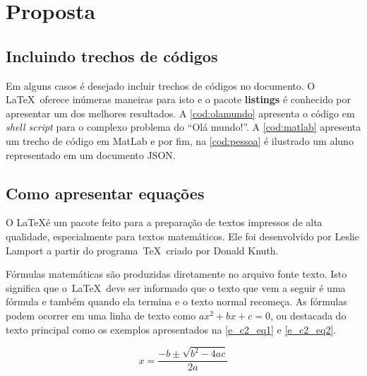 \chapter{Proposta}\label{cap:proposta}


\section{Incluindo trechos de códigos}\label{sec:codigos}

Em alguns casos é desejado incluir trechos de códigos no documento. O \LaTeX~oferece inúmeras maneiras para isto e o pacote \textbf{listings} é conhecido por apresentar um dos melhores resultados. A \autoref{cod:olamundo} apresenta o código em \textit{shell script} para o complexo problema do ``Olá mundo!''. A \autoref{cod:matlab} apresenta um trecho de código em MatLab e por fim, na \autoref{cod:pessoa} é ilustrado um aluno representado em um documento JSON.








\section{Como apresentar equações}\label{sec:equacoes}

O \LaTeX é um pacote feito para a preparação de textos impressos de alta qualidade, especialmente
para textos matemáticos. Ele foi desenvolvido por Leslie Lamport a partir do programa~\TeX~criado por Donald Knuth.

Fórmulas matemáticas são produzidas diretamente no arquivo fonte texto. Isto significa que o~\LaTeX~deve ser informado que o texto que vem a seguir é uma fórmula e também quando ela termina e o texto normal recomeça. As fórmulas podem ocorrer em uma linha de texto como $ ax^2 + bx + c = 0 $, ou destacada do texto principal como os exemplos apresentados na \autoref{e_c2_eq1} e \autoref{e_c2_eq2}.

\begin{equation}
 x=\frac{-b\pm\sqrt{b^2-4ac}}{2a}
\label{e_c2_eq1}
\end{equation}

